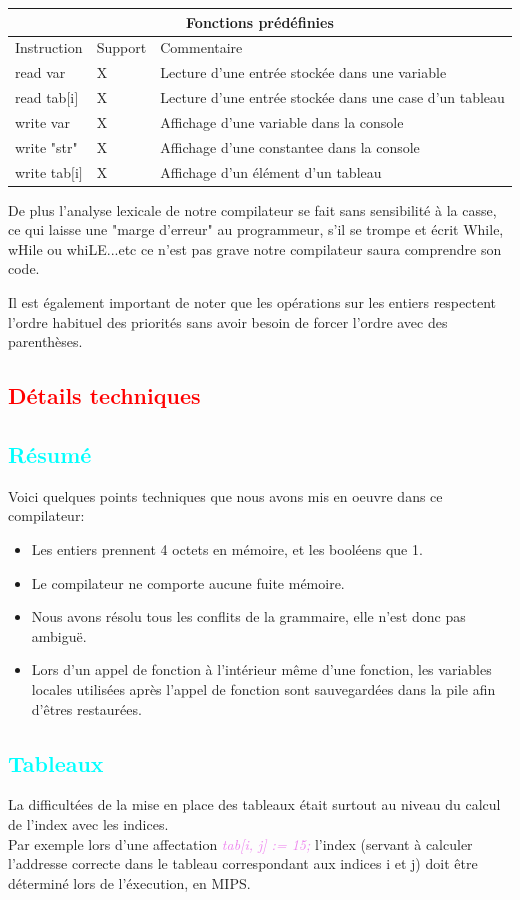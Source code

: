 \documentclass[a4paper]{article}
\let\oldtextit\textit
\renewcommand{\textit}[1]{\textcolor{violet}{\oldtextit{#1}}}
\newcommand{\csection}[1]{\textcolor{red}{\section{#1}}}
\newcommand{\csubsection}[1]{\textcolor{cyan}{\subsection{#1}}}
\begin{document}
\begin{center}
\begin{tabular}{|l|l|l|}
  \hline
  \multicolumn{3}{|c|}{Fonctions prédéfinies} \\
  \hline
  Instruction & Support & Commentaire \\
  \hline
  read var & X & Lecture d'une entrée stockée dans une variable \\
  read tab$[$i$]$ & X & Lecture d'une entrée stockée dans une case d'un tableau \\
  write var & X & Affichage d'une variable dans la console \\
  write "str" & X & Affichage d'une constantee dans la console \\
  write tab$[$i$]$ & X & Affichage d'un élément d'un tableau \\
  \hline
\end{tabular}

\end{center}

De plus l'analyse lexicale de notre compilateur se fait sans sensibilité à la casse, ce qui laisse une "marge d'erreur" au programmeur, s'il se trompe et écrit While, wHile ou whiLE...etc ce n'est pas grave notre compilateur saura comprendre son code.

Il est également important de noter que les opérations sur les entiers respectent l'ordre habituel des priorités sans avoir besoin de forcer l'ordre avec des parenthèses.

\csection{Détails techniques}

\csubsection{Résumé}

Voici quelques points techniques que nous avons mis en oeuvre dans ce compilateur:
\begin{itemize}
    \item Les entiers prennent 4 octets en mémoire, et les booléens que 1.
    \item Le compilateur ne comporte aucune fuite mémoire.
    \item Nous avons résolu tous les conflits de la grammaire, elle n'est donc pas ambiguë.
    \item Lors d'un appel de fonction à l'intérieur même d'une fonction, les variables locales utilisées après l'appel de fonction sont sauvegardées dans la pile afin d'êtres restaurées.
\end{itemize}

\csubsection{Tableaux}

La difficultées de la mise en place des tableaux était surtout au niveau du calcul de l'index avec les indices.\\
Par exemple lors d'une affectation \textit{tab[i, j] := 15;} l'index (servant à calculer l'addresse correcte dans le tableau correspondant aux indices i et j) doit être déterminé lors de l'éxecution, en MIPS.
\end{document}

